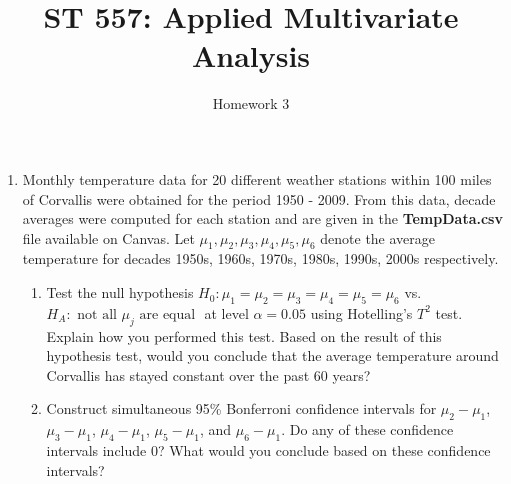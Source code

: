 \documentclass{article}
\title{ST 557: Applied Multivariate Analysis}
\author{Homework 3}
\date{}
\theoremstyle{plain}
\theoremstyle{definition}
\theoremstyle{remark}
\begin{document}
\maketitle{}

\begin{enumerate}

\item Monthly temperature data for 20 different weather stations within 100 miles of Corvallis were obtained for the period 1950 - 2009.  From this data, decade averages were computed for each station and are given in the \textbf{TempData.csv} file available on Canvas.  Let $\mu_1, \mu_2, \mu_3, \mu_4, \mu_5, \mu_6$ denote the average temperature for decades 1950s, 1960s, 1970s, 1980s, 1990s, 2000s respectively.
\begin{enumerate}
\item Test the null hypothesis $H_0: \mu_1 = \mu_2 = \mu_3 = \mu_4 = \mu_5 = \mu_6$ vs. $H_A: \text{ not all }\mu_j \text{ are equal }$ at level $\alpha = 0.05$ using Hotelling's $T^2$ test.  Explain how you performed this test.  Based on the result of this hypothesis test, would you conclude that the average temperature around Corvallis has stayed constant over the past 60 years?
\item Construct simultaneous 95\% Bonferroni confidence intervals for $\mu_2 - \mu_1$, $\mu_3 - \mu_1$, $\mu_4 - \mu_1$, $\mu_5 - \mu_1$, and $\mu_6 - \mu_1$. Do any of these confidence intervals include 0?  What would you conclude based on these confidence intervals?
\end{enumerate}



\end{enumerate}
\end{document}
